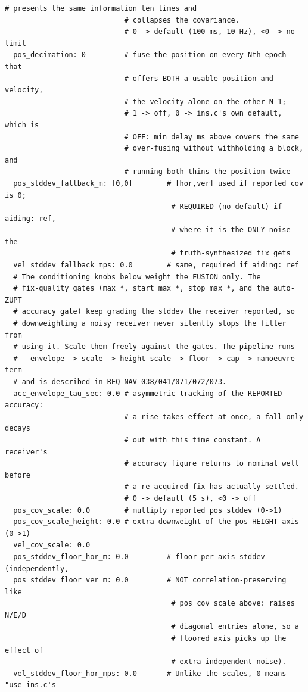 \documentclass[11pt,a4paper]{article}
\begin{document}
\begin{lstlisting}[style=cfg]
                            # presents the same information ten times and
                            # collapses the covariance.
                            # 0 -> default (100 ms, 10 Hz), <0 -> no limit
  pos_decimation: 0         # fuse the position on every Nth epoch that
                            # offers BOTH a usable position and velocity,
                            # the velocity alone on the other N-1;
                            # 1 -> off, 0 -> ins.c's own default, which is
                            # OFF: min_delay_ms above covers the same
                            # over-fusing without withholding a block, and
                            # running both thins the position twice
  pos_stddev_fallback_m: [0,0]        # [hor,ver] used if reported cov is 0;
                                       # REQUIRED (no default) if aiding: ref,
                                       # where it is the ONLY noise the
                                       # truth-synthesized fix gets
  vel_stddev_fallback_mps: 0.0        # same, required if aiding: ref
  # The conditioning knobs below weight the FUSION only. The
  # fix-quality gates (max_*, start_max_*, stop_max_*, and the auto-ZUPT
  # accuracy gate) keep grading the stddev the receiver reported, so
  # downweighting a noisy receiver never silently stops the filter from
  # using it. Scale them freely against the gates. The pipeline runs
  #   envelope -> scale -> height scale -> floor -> cap -> manoeuvre term
  # and is described in REQ-NAV-038/041/071/072/073.
  acc_envelope_tau_sec: 0.0 # asymmetric tracking of the REPORTED accuracy:
                            # a rise takes effect at once, a fall only decays
                            # out with this time constant. A receiver's
                            # accuracy figure returns to nominal well before
                            # a re-acquired fix has actually settled.
                            # 0 -> default (5 s), <0 -> off
  pos_cov_scale: 0.0        # multiply reported pos stddev (0->1)
  pos_cov_scale_height: 0.0 # extra downweight of the pos HEIGHT axis (0->1)
  vel_cov_scale: 0.0
  pos_stddev_floor_hor_m: 0.0         # floor per-axis stddev (independently,
  pos_stddev_floor_ver_m: 0.0         # NOT correlation-preserving like
                                       # pos_cov_scale above: raises N/E/D
                                       # diagonal entries alone, so a
                                       # floored axis picks up the effect of
                                       # extra independent noise).
  vel_stddev_floor_hor_mps: 0.0       # Unlike the scales, 0 means "use ins.c's

\end{lstlisting}
\end{document}
